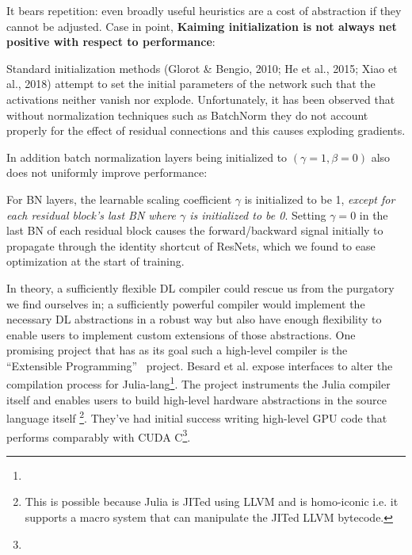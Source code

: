 It bears repetition: even broadly useful heuristics are a cost of abstraction if they cannot be adjusted.
Case in point, \textbf{Kaiming initialization is not always net positive with respect to performance}:
\begin{displayquote}
    Standard initialization methods (Glorot \& Bengio, 2010; He et al., 2015; Xiao et al., 2018) attempt to  set  the  initial  parameters  of  the  network  such  that  the  activations  neither  vanish  nor  explode.
    Unfortunately, it has been observed that without normalization techniques such as BatchNorm they do not account properly for the effect of residual connections and this causes exploding gradients.
\end{displayquote}
In addition batch normalization layers being initialized to $(\gamma=1,\beta=0)$ also does not uniformly improve performance:
\begin{displayquote}
    For BN layers, the learnable scaling coefficient $\gamma$ is initialized  to  be  1, \textit{except  for  each  residual  block’s  last  BN where $\gamma$ is initialized to be 0}.
    Setting $\gamma = 0$ in the last BN of each residual block causes the forward/backward signal initially to propagate through the identity shortcut of ResNets, which we found to ease optimization at the start of training.
\end{displayquote}

In theory, a sufficiently flexible DL compiler could rescue us from the purgatory we find ourselves in;
a sufficiently powerful compiler would implement the necessary DL abstractions in a robust way but also have enough flexibility to enable users to implement custom extensions of those abstractions.
One promising project that has as its goal such a high-level compiler is the ``Extensible Programming''~\cite{Besard_2019} project.
Besard et al. expose interfaces to alter the compilation process for Julia-lang\footnote{}.
The project instruments the Julia compiler itself and enables users to build high-level hardware abstractions in the source language itself%
\footnote{This is possible because Julia is JITed using LLVM and is homo-iconic i.e. it supports a macro system that can manipulate the JITed LLVM bytecode.}.
They've had initial success writing high-level GPU code that performs comparably with CUDA C\footnote{}.

